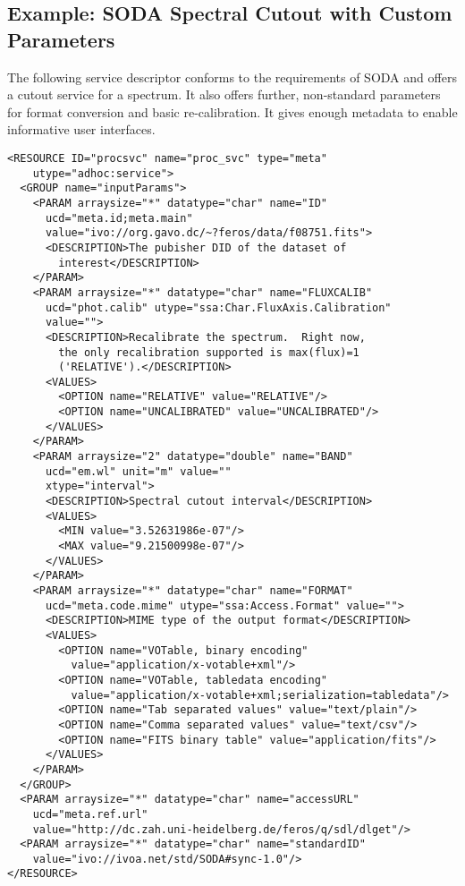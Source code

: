 \documentclass[11pt,a4paper]{ivoa}
\begin{document}
\subsection{Example: SODA Spectral Cutout with Custom Parameters}

The following service descriptor conforms to the requirements of SODA
\citep{2017ivoa.spec.0517B} and offers a cutout service for a spectrum.
It also offers further, non-standard parameters for format conversion
and basic re-calibration.  It gives enough metadata to enable
informative user interfaces.

{\small
\begin{verbatim}
<RESOURCE ID="procsvc" name="proc_svc" type="meta" 
    utype="adhoc:service">
  <GROUP name="inputParams">
    <PARAM arraysize="*" datatype="char" name="ID" 
      ucd="meta.id;meta.main" 
      value="ivo://org.gavo.dc/~?feros/data/f08751.fits">
      <DESCRIPTION>The pubisher DID of the dataset of 
        interest</DESCRIPTION>
    </PARAM>
    <PARAM arraysize="*" datatype="char" name="FLUXCALIB" 
      ucd="phot.calib" utype="ssa:Char.FluxAxis.Calibration" 
      value="">
      <DESCRIPTION>Recalibrate the spectrum.  Right now, 
        the only recalibration supported is max(flux)=1 
        ('RELATIVE').</DESCRIPTION>
      <VALUES>
        <OPTION name="RELATIVE" value="RELATIVE"/>
        <OPTION name="UNCALIBRATED" value="UNCALIBRATED"/>
      </VALUES>
    </PARAM>
    <PARAM arraysize="2" datatype="double" name="BAND" 
      ucd="em.wl" unit="m" value="" 
      xtype="interval">
      <DESCRIPTION>Spectral cutout interval</DESCRIPTION>
      <VALUES>
        <MIN value="3.52631986e-07"/>
        <MAX value="9.21500998e-07"/>
      </VALUES>
    </PARAM>
    <PARAM arraysize="*" datatype="char" name="FORMAT" 
      ucd="meta.code.mime" utype="ssa:Access.Format" value="">
      <DESCRIPTION>MIME type of the output format</DESCRIPTION>
      <VALUES>
        <OPTION name="VOTable, binary encoding" 
          value="application/x-votable+xml"/>
        <OPTION name="VOTable, tabledata encoding" 
          value="application/x-votable+xml;serialization=tabledata"/>
        <OPTION name="Tab separated values" value="text/plain"/>
        <OPTION name="Comma separated values" value="text/csv"/>
        <OPTION name="FITS binary table" value="application/fits"/>
      </VALUES>
    </PARAM>
  </GROUP>
  <PARAM arraysize="*" datatype="char" name="accessURL" 
    ucd="meta.ref.url" 
    value="http://dc.zah.uni-heidelberg.de/feros/q/sdl/dlget"/>
  <PARAM arraysize="*" datatype="char" name="standardID" 
    value="ivo://ivoa.net/std/SODA#sync-1.0"/>
</RESOURCE>

\end{verbatim}
}
\end{document}
